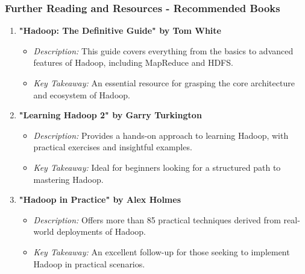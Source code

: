 \documentclass[aspectratio=169]{beamer}
\begin{document}
\begin{frame}[fragile]
    \frametitle{Further Reading and Resources - Recommended Books}
    \begin{enumerate}
        \item \textbf{"Hadoop: The Definitive Guide" by Tom White} 
        \begin{itemize}
            \item \textit{Description:} This guide covers everything from the basics to advanced features of Hadoop, including MapReduce and HDFS.
            \item \textit{Key Takeaway:} An essential resource for grasping the core architecture and ecosystem of Hadoop.
        \end{itemize}
        
        \item \textbf{"Learning Hadoop 2" by Garry Turkington}
        \begin{itemize}
            \item \textit{Description:} Provides a hands-on approach to learning Hadoop, with practical exercises and insightful examples.
            \item \textit{Key Takeaway:} Ideal for beginners looking for a structured path to mastering Hadoop.
        \end{itemize}
        
        \item \textbf{"Hadoop in Practice" by Alex Holmes}
        \begin{itemize}
            \item \textit{Description:} Offers more than 85 practical techniques derived from real-world deployments of Hadoop.
            \item \textit{Key Takeaway:} An excellent follow-up for those seeking to implement Hadoop in practical scenarios.
        \end{itemize}
    \end{enumerate}
\end{frame}
\end{document}
